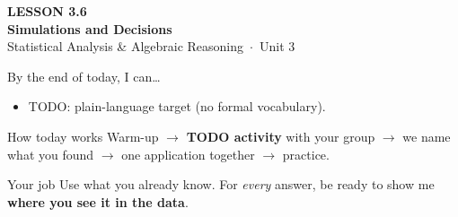 \documentclass[aspectratio=169, 11pt]{beamer}
\begin{document}
{
\begin{frame}[plain]
  \vspace{2.8cm}\hspace{0.55cm}%
  \begin{minipage}{0.9\textwidth}
    {\color{goldacc}\bfseries\small LESSON 3.6}\\[0.5cm]
    {\color{white}\bfseries\LARGE Simulations and Decisions}\\[1.2cm]
    {\color{frostmid}\small Statistical Analysis \& Algebraic Reasoning~$\cdot$~Unit 3}
  \end{minipage}
\end{frame}
}

\newcommand{\redink}[1]{{\color{redacc}\bfseries #1}}

\begin{frame}[t, plain]
  By the end of today, I can\ldots
  \begin{itemize}\setlength{\itemsep}{6pt}
    \item TODO: plain-language target (no formal vocabulary).
  \end{itemize}
  \begin{block}{How today works}
    Warm-up $\to$ \textbf{TODO activity} with your group $\to$ we name what you found $\to$
    one application together $\to$ practice.
  \end{block}
\end{frame}

\begin{frame}[t, plain]
\end{frame}

\begin{frame}[t, plain]
  \begin{block}{Your job}
    Use what you already know. For \emph{every} answer, be ready to show me
    \textbf{where you see it in the data}.
  \end{block}
\end{frame}
\end{document}
